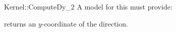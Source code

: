 \begin{ccRefFunctionObjectConcept}{Kernel::ComputeDy_2}
A model for this must provide:



       {returns an $y$-coordinate of the direction.}

\ccRefines
{}



\end{ccRefFunctionObjectConcept}
